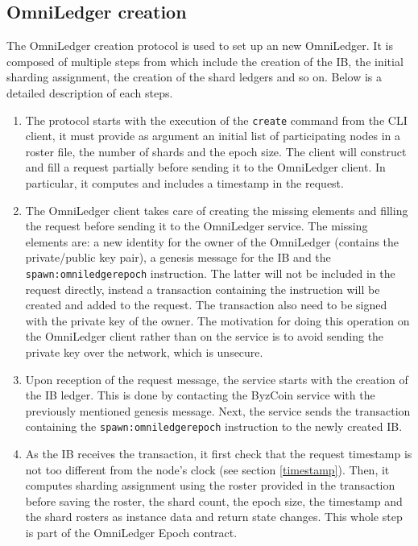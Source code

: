 \subsection{OmniLedger creation} \label{ol-creation}
The OmniLedger creation protocol is used to set up an new OmniLedger. It is composed of multiple steps from which include the creation of the IB, the initial sharding assignment, the creation of the shard ledgers and so on. Below is a detailed description of each steps.
\begin{enumerate}
	\item The protocol starts with the execution of the \texttt{create} command from the CLI client, it must provide as argument an initial list of participating nodes in a roster file, the number of shards and the epoch size. The client will construct and fill a request partially before sending it to the OmniLedger client. In particular, it computes and includes a timestamp in the request.
	
	\item The OmniLedger client takes care of creating the missing elements and filling the request before sending it to the OmniLedger service. The missing elements are: a new identity for the owner of the OmniLedger (contains the private/public key pair), a genesis message for the IB and the \texttt{spawn:omniledgerepoch} instruction. The latter will not be included in the request directly, instead a transaction containing the instruction will be created and added to the request. The transaction also need to be signed with the private key of the owner. The motivation for doing this operation on the OmniLedger client rather than on the service is to avoid sending the private key over the network, which is unsecure.
	
	\item Upon reception of the request message, the service starts with the creation of the IB ledger. This is done by contacting the ByzCoin service with the previously mentioned genesis message. Next, the service sends the transaction containing the \texttt{spawn:omniledgerepoch} instruction to the newly created IB. 
	
	\item As the IB receives the transaction, it first check that the request timestamp is not too different from the node's clock (see section \ref{timestamp}). Then, it computes sharding assignment using the roster provided in the transaction before saving the roster, the shard count, the epoch size, the timestamp and the shard rosters as instance data and return state changes. This whole step is part of the OmniLedger Epoch contract.
	

\end{enumerate}
